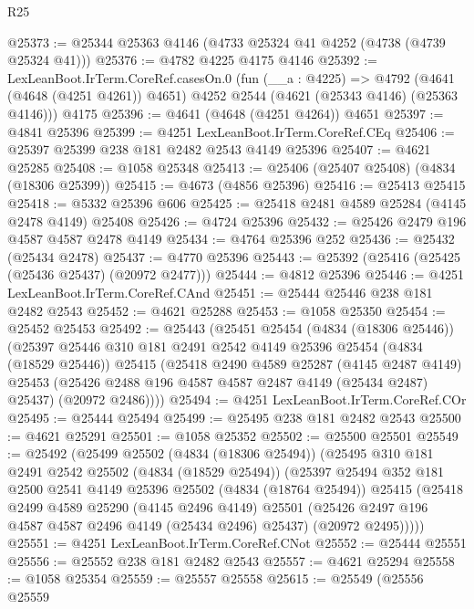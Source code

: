 \begin{lexlean}{R25}
\begin{coremodule}
@25373 := @25344 @25363 @4146 (@4733 @25324 @41 @4252 (@4738 (@4739 @25324 @41)))
@25376 := @4782 @4225 @4175 @4146
@25392 := LexLeanBoot.IrTerm.CoreRef.casesOn.{0}
    (fun (__a : @4225) =>
    @4792 (@4641 (@4648 (@4251 @4261)) @4651) @4252 @2544 (@4621 (@25343 @4146) (@25363 @4146)))
    @4175
@25396 := @4641 (@4648 (@4251 @4264)) @4651
@25397 := @4841 @25396
@25399 := @4251 LexLeanBoot.IrTerm.CoreRef.CEq
@25406 := @25397 @25399 @238 @181 @2482 @2543 @4149 @25396
@25407 := @4621 @25285
@25408 := @1058 @25348
@25413 := @25406 (@25407 @25408) (@4834 (@18306 @25399))
@25415 := @4673 (@4856 @25396)
@25416 := @25413 @25415
@25418 := @5332 @25396 @606
@25425 := @25418 @2481 @4589 @25284 (@4145 @2478 @4149) @25408
@25426 := @4724 @25396
@25432 := @25426 @2479 @196 @4587 @4587 @2478 @4149
@25434 := @4764 @25396 @252
@25436 := @25432 (@25434 @2478)
@25437 := @4770 @25396
@25443 := @25392 (@25416 (@25425 (@25436 @25437) (@20972 @2477)))
@25444 := @4812 @25396
@25446 := @4251 LexLeanBoot.IrTerm.CoreRef.CAnd
@25451 := @25444 @25446 @238 @181 @2482 @2543
@25452 := @4621 @25288
@25453 := @1058 @25350
@25454 := @25452 @25453
@25492 := @25443
    (@25451
      @25454
      (@4834 (@18306 @25446))
      (@25397
        @25446
        @310
        @181
        @2491
        @2542
        @4149
        @25396
        @25454
        (@4834 (@18529 @25446))
        @25415
        (@25418
          @2490
          @4589
          @25287
          (@4145 @2487 @4149)
          @25453
          (@25426 @2488 @196 @4587 @4587 @2487 @4149 (@25434 @2487) @25437)
          (@20972 @2486))))
@25494 := @4251 LexLeanBoot.IrTerm.CoreRef.COr
@25495 := @25444 @25494
@25499 := @25495 @238 @181 @2482 @2543
@25500 := @4621 @25291
@25501 := @1058 @25352
@25502 := @25500 @25501
@25549 := @25492
    (@25499
      @25502
      (@4834 (@18306 @25494))
      (@25495
        @310
        @181
        @2491
        @2542
        @25502
        (@4834 (@18529 @25494))
        (@25397
          @25494
          @352
          @181
          @2500
          @2541
          @4149
          @25396
          @25502
          (@4834 (@18764 @25494))
          @25415
          (@25418
            @2499
            @4589
            @25290
            (@4145 @2496 @4149)
            @25501
            (@25426 @2497 @196 @4587 @4587 @2496 @4149 (@25434 @2496) @25437)
            (@20972 @2495)))))
@25551 := @4251 LexLeanBoot.IrTerm.CoreRef.CNot
@25552 := @25444 @25551
@25556 := @25552 @238 @181 @2482 @2543
@25557 := @4621 @25294
@25558 := @1058 @25354
@25559 := @25557 @25558
@25615 := @25549
    (@25556
      @25559

\end{coremodule}
\end{lexlean}
